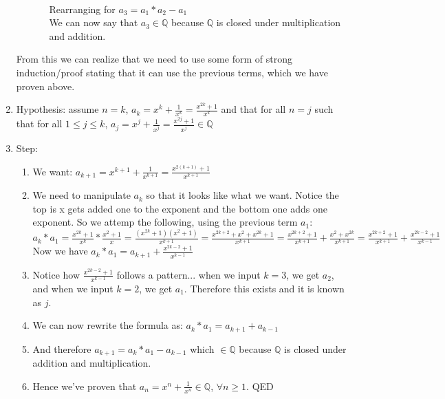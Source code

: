 \documentclass[11pt,letterpaper]{article}
\begin{document}
\begin{enumerate}
\begin{enumerate}
\begin{enumerate}
			\\ Rearranging for $a_3 = a_1 * a_2 - a_1$
			\\ We can now say that $a_3 \in \mathbb{Q}$ because $\mathbb{Q}$ is closed under multiplication and addition.
		\end{enumerate}
	\end{enumerate}
	From this we can realize that we need to use some form of strong induction/proof stating that it can use the previous terms, which we have proven above. 
	\item[] Hypothesis: assume $n = k$, $a_k = x^k + \frac{1}{x^k} = \frac{x^{2k} + 1}{x^k}$ and that for all $n = j$ such that for all $1 \leq j \leq k$, $a_j = x^j + \frac{1}{x^j} = \frac{x^{2j} + 1}{x^j} \in \mathbb{Q}$
	\item[] Step: 
	\begin{enumerate}
		\item We want: $a_{k+1} = x^{k+1} + \frac{1}{x^{k+1}} = \frac{x^{2(k+1)} + 1}{x^{k+1}}$
		\item We need to manipulate $a_k$ so that it looks like what we want. Notice the top is x gets added one to the exponent and the bottom one adds one exponent. So we attemp the following, using the previous term $a_1$:
		\\ $a_k * a_1 = \frac{x^{2k} + 1}{x^k} * \frac{x^2 + 1}{x} = \frac{(x^{2k} + 1)(x^2 + 1)}{x^{k+1}} = \frac{x^{2k + 2} + x^2 + x^{2k} + 1}{x^{k+1}} = \frac{x^{2k + 2} + 1}{x^{k+1}} + \frac{x^2 + x^{2k}}{x^{k+1}} = \frac{x^{2k + 2} + 1}{x^{k+1}} + \frac{x^{2k-2} + 1}{x^{k-1}}$
		\\ Now we have $a_k * a_1 = a_{k+1} + \frac{x^{2k-2} + 1}{x^{k-1}}$
		\item Notice how $\frac{x^{2k-2} + 1}{x^{k-1}}$ follows a pattern... when we input $k = 3$, we get $a_2$, and when we input $k = 2$, we get $a_1$. Therefore this exists and it is known as $j$. 
		\item We can now rewrite the formula as: $a_k * a_1 = a_{k+1} + a_{k-1}$
		\item And therefore $a_{k+1} = a_k * a_1 - a_{k-1}$ which $\in \mathbb{Q}$ because $\mathbb{Q}$ is closed under addition and multiplication.
		\item Hence we've proven that  $a_n = x^n + \frac{1}{x^n} \in \mathbb{Q}$, $\forall n \geq 1$. QED
	\end{enumerate}	 
\end{enumerate}

\newpage
\end{document}
